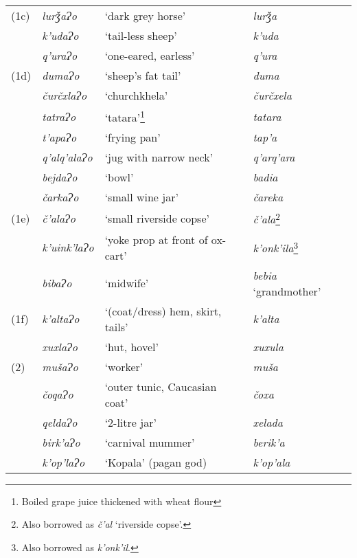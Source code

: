 \begin{longtable}{llll}
    		\midrule
            
			(1c) & \textit{lurǯaɁo} & `dark grey horse' & \textit{lurǯa}  \\
			& \textit{k'udaɁo} & `tail-less sheep' & \textit{k'uda} \\
			& \textit{q'uraɁo} & `one-eared, earless' & \textit{q'ura} \\
            
		\midrule
        
			(1d) & \textit{dumaɁo} & `sheep's fat tail' & \textit{duma} \\
			& \textit{čurčxlaɁo} & `churchkhela' & \textit{čurčxela} \\
			& \textit{tatraɁo} & `tatara'\footnote{Boiled grape juice thickened with wheat flour} & \textit{tatara} \\
			& \textit{t'apaɁo} & `frying pan' & \textit{tap'a} \\
			& \textit{q'alq'alaɁo} & `jug with narrow neck' & \textit{q'arq'ara} \\
			& \textit{bejdaɁo} & `bowl' & \textit{badia} \\
			& \textit{čarkaɁo} & `small wine jar' & \textit{čareka} \\
            
		\midrule
        
			(1e) & \textit{č'alaɁo} & `small riverside copse' & \textit{č'ala}\footnote{Also borrowed as \textit{č'al} `riverside copse'.} \\
			& \textit{k'uink'laɁo} & `yoke prop at front of ox-cart' & \textit{k'onk'ila}\footnote{Also borrowed as \textit{k'onk'il}.} \\
			& \textit{bibaɁo} & `midwife' & \textit{bebia} `grandmother' \\
            
			\midrule
            
			(1f)
			& \textit{k'altaɁo} & `(coat/dress) hem, skirt, tails' & \textit{k'alta} \\
			& \textit{xuxlaɁo} & `hut, hovel' & \textit{xuxula}  \\
			
			\midrule
            
			(2) & \textit{mušaɁo} & `worker' & \textit{muša} \\
			& \textit{čoqaɁo} & `outer tunic, Caucasian coat' & \textit{čoxa} \\
			& \textit{qeldaɁo} & `2-litre jar' & \textit{xelada} \\
			& \textit{birk'aɁo} & `carnival mummer' & \textit{berik'a} \\
			& \textit{k'op'laɁo} & `Kopala' (pagan god) & \textit{k'op'ala} \\



\end{longtable}
